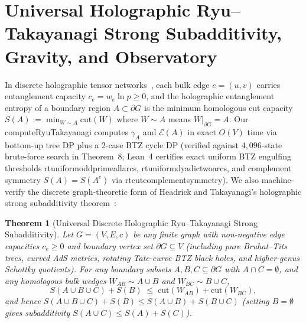 \documentclass[11pt,a4paper]{article}
\numberwithin{equation}{section}
\theoremstyle{plain}
\newtheorem{theorem}{Theorem}[section]
\theoremstyle{definition}
\theoremstyle{remark}
\newcommand{\code}[1]{{\ttfamily\footnotesize\def\_{\textunderscore\penalty0\hskip0pt}#1}}
\begin{document}
\section[Ryu--Takayanagi Strong Subadditivity and Observatory]{Universal Holographic Ryu--Takayanagi Strong Subadditivity, Gravity, and Observatory}
\label{sec:rt-gravity}

In discrete holographic tensor networks~\cite{RyuTakayanagi2006,Heydeman2018,Pastawski2015}, each bulk edge $e = (u, v)$ carries entanglement capacity $c_e = w_e \ln p \ge 0$, and the holographic entanglement entropy of a boundary region $A \subset \partial G$ is the minimum homologous cut capacity $S(A) := \min_{W \sim A} \mathrm{cut}(W)$ where $W \sim A$ means $W|_{\partial G} = A$. Our \code{computeRyuTakayanagi} computes $\gamma_A$ and $\mathcal{E}(A)$ in exact $O(V)$ time via bottom-up tree DP plus a $2$-case BTZ cycle DP (verified against $4{,}096$-state brute-force search in \code{Theorem~8}; Lean~4 certifies exact uniform BTZ engulfing thresholds \code{rt\_uniform\_odd\_prime\_all\_arcs}, \code{rt\_uniform\_dyadic\_two\_arcs}, and complement symmetry $S(A) = S(A^c)$ via \code{rt\_cut\_complement\_symmetry}). We also machine-verify the discrete graph-theoretic form of Headrick and Takayanagi's holographic strong subadditivity theorem~\cite{HeadrickTakayanagi2007}:

\begin{theorem}[Universal Discrete Holographic Ryu--Takayanagi Strong Subadditivity]
\label{thm:rt-ssa}
Let $G = (V, E, c)$ be \emph{any} finite graph with non-negative edge capacities $c_e \ge 0$ and boundary vertex set $\partial G \subseteq V$ (including pure Bruhat--Tits trees, curved AdS metrics, rotating Tate-curve BTZ black holes, and higher-genus Schottky quotients). For any boundary subsets $A, B, C \subseteq \partial G$ with $A \cap C = \emptyset$, and any homologous bulk wedges $W_{AB} \sim A \cup B$ and $W_{BC} \sim B \cup C$,
\begin{equation}
  S(A \cup B \cup C) + S(B) \;\le\; \mathrm{cut}(W_{AB}) + \mathrm{cut}(W_{BC}),
  \label{eq:rt-ssa}
\end{equation}
and hence $S(A \cup B \cup C) + S(B) \le S(A \cup B) + S(B \cup C)$ (setting $B = \emptyset$ gives subadditivity $S(A \cup C) \le S(A) + S(C)$).
\end{theorem}
\end{document}
